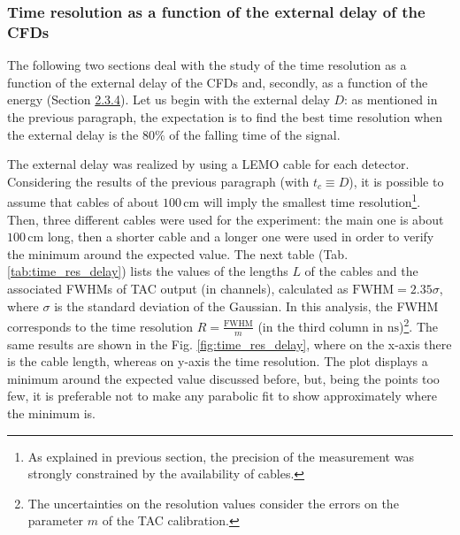 \documentclass[a4paper]{article}
\begin{document}
\subsubsection{Time resolution as a function of the external delay of the CFDs}
The following two sections deal with the study of the time resolution as a function of the external delay of the CFDs and, secondly, as a function of the energy (Section \hyperlink{2.3.4}{2.3.4}). Let us begin with the external delay $D$: as mentioned in the previous paragraph, the expectation is to find the best time resolution when the external delay is the $80\%$ of the falling time of the signal.

The external delay was realized by using a LEMO cable for each detector. Considering the results of the previous paragraph (with $t_c\equiv D$), it is possible to assume that cables of about $100\, \mathrm{cm}$ will imply the smallest time resolution\footnote{As explained in previous section, the precision of the measurement was strongly constrained by the availability of cables.}. 
Then, three different cables were used for the experiment: the main one is about $100\,\mathrm{cm}$ long, then a shorter cable and a longer one were used in order to verify the minimum around the expected value. The next table (Tab. \ref{tab:time_res_delay}) lists the values of the lengths $L$ of the cables and the associated FWHMs of TAC output (in channels), calculated as $\mathrm{FWHM}=2.35\sigma$, where $\sigma$ is the standard deviation of the Gaussian. In this analysis, the FWHM corresponds to the time resolution $R=\tfrac{\mathrm{FWHM}}{m}$ (in the third column in $\mathrm{ns}$)\footnote{The uncertainties on the resolution values consider the errors on the parameter $m$ of the TAC calibration.}. %
The same results are shown in the Fig. \ref{fig:time_res_delay}, where on the x-axis there is the cable length, whereas on y-axis the time resolution. The plot displays a minimum around the expected value discussed before, but, %
being the points too few, it is preferable not to make any parabolic fit to show approximately where the minimum is.
\end{document}
